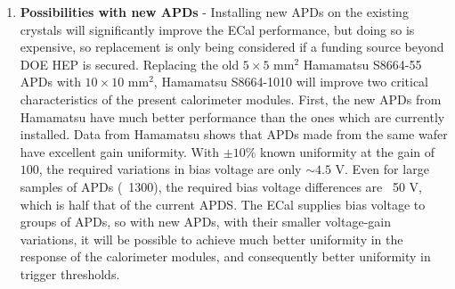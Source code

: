 \begin{enumerate}
\item{\bf Possibilities with new APDs} - Installing new APDs on the existing crystals will significantly improve the ECal performance, but doing so is expensive,  so replacement is only being considered if a funding source beyond DOE HEP is secured. Replacing the old $5\times 5$ mm$^2$ 
Hamamatsu S8664-55 APDs with $10\times 10$ mm$^2$, Hamamatsu S8664-1010 will improve two critical characteristics of the present calorimeter modules. First, the new APDs from Hamamatsu have much better performance than the ones which are currently installed. Data from Hamamatsu shows that APDs made from the same wafer have excellent gain uniformity. With $\pm 10\%$ known uniformity 
at the gain of $100$, the required variations in bias voltage are only $\sim 4.5$ V. Even for large samples of APDs (~1300),  the required bias voltage differences are ~50 V, which is half that of the current APDS. The ECal supplies bias voltage to groups of APDs, so with new APDs, with their smaller voltage-gain variations, it will be possible to achieve much better 
uniformity in the response of the calorimeter modules, and consequently better uniformity in trigger thresholds. 


\end{enumerate}
